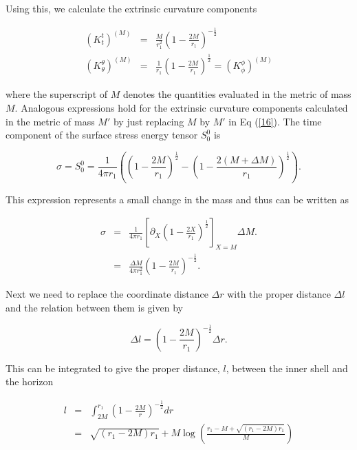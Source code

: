 \documentclass[aps,showpacs,onecolumn,floats,prd,superscriptaddress,nofootinbib]{revtex4-1}
\begin{document}
Using this, we calculate the extrinsic curvature components

\begin{eqnarray}
	(K^t_t)^{(M)} & = & \frac{M}{r_1^2} \left( 1 - \frac{2M}{r_1} \right)^{-\frac{1}{2}} 	\nonumber	\\
	(K^\theta_\theta)^{(M)} & = & \frac{1}{r_1} \left( 1 - \frac{2M}{r_1} \right)^\frac{1}{2} 
	= (K^\phi_\phi)^{(M)}	\label{16}
\end{eqnarray}

where the superscript of $M$ denotes the quantities evaluated in the metric of mass $M$. Analogous expressions hold for the extrinsic curvature components calculated in the metric of mass $M'$ by just replacing $M$ by $M'$ in Eq (\ref{16}).
 The time component of the surface stress energy tensor $S^0_0$ is 

\begin{equation}
	\sigma = S^0_0 = \frac{1}{4 \pi r_1} \left( \left( 1 - \frac{2M}{r_1} \right)^\frac{1}{2} - \left( 1 - \frac{2(M+\Delta M)}{r_1} \right)^\frac{1}{2} \right).
\end{equation}

This expression represents a small change in the mass and thus can be written as

\begin{eqnarray}
	\sigma & = & \frac{1}{4 \pi r_1} \left[ \partial_X \left( 1 - \frac{2X}{r_1} \right)^\frac{1}{2} \right]_{X = M} \Delta M. \nonumber	\\
	& = &  \frac{\Delta M}{4 \pi r_1^2} \left( 1 - \frac{2M}{r_1} \right)^{-\frac{1}{2}}.	\label{sig-Dm}
\end{eqnarray}

Next we need to replace the coordinate distance $\Delta r$ with the proper distance $\Delta l$ and the relation between them is given by

\begin{equation}
	\Delta l = \left( 1 - \frac{2M}{r_1} \right)^{-\frac{1}{2}} \Delta r.	\label{Dl-Dr}
\end{equation}

This can be integrated to give the proper distance, $l$, between the inner shell and the horizon

\begin{eqnarray}
	l & = & \int^{r_1}_{2M} \left( 1 - \frac{2M}{r} \right)^{-\frac{1}{2}} dr	\nonumber	\\
	& = & \sqrt{(r_1 - 2M)r_1} + M \log \left( \frac{ r_1 - M + \sqrt{(r_1 - 2M)r_1}}{M} \right)	\label{l-r}
\end{eqnarray}
\end{document}
